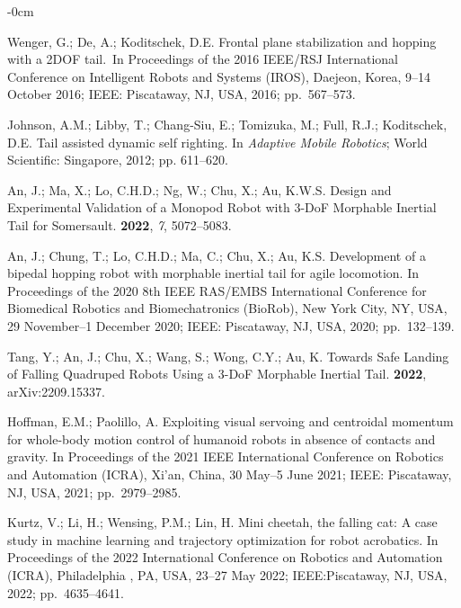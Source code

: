 \documentclass[sensors,article,accept,pdftex,moreauthors]{Definitions/mdpi}
\begin{document}
\begin{adjustwidth}{-\extralength}{0cm}
\begin{thebibliography}{999}
Wenger, G.; De, A.; Koditschek, D.E.
\newblock Frontal plane stabilization and hopping with a 2DOF tail.~In Proceedings of the 2016 IEEE/RSJ International Conference on
  Intelligent Robots and Systems (IROS), Daejeon, Korea, 9--14 October 2016; IEEE: \mbox{Piscataway}, NJ, USA,  2016; pp.~567--573.

Johnson, A.M.; Libby, T.; Chang-Siu, E.; Tomizuka, M.; Full, R.J.; Koditschek,
  D.E.
\newblock Tail assisted dynamic self righting. In {\em Adaptive Mobile
  Robotics}; World Scientific: Singapore,
  2012; pp. 611--620.

An, J.; Ma, X.; Lo, C.H.D.; Ng, W.; Chu, X.; Au, K.W.S.
\newblock Design and Experimental Validation of a Monopod Robot with 3-DoF
  Morphable Inertial Tail for Somersault.
 {\bf 2022}, \emph{7}, 5072--5083.

An, J.; Chung, T.; Lo, C.H.D.; Ma, C.; Chu, X.; Au, K.S.
\newblock Development of a bipedal hopping robot with morphable inertial tail
  for agile locomotion.
\newblock In Proceedings of the 2020 8th IEEE RAS/EMBS International Conference
  for Biomedical Robotics and Biomechatronics (BioRob),  New York City, NY, USA, 29 November--1 December 2020; IEEE: Piscataway, NJ, USA,  2020; \mbox{pp.
  132--139.}

Tang, Y.; An, J.; Chu, X.; Wang, S.; Wong, C.Y.; Au, K.
\newblock Towards Safe Landing of Falling Quadruped Robots Using a 3-DoF
  Morphable Inertial Tail.
 {\bf 2022},  arXiv:2209.15337.

Hoffman, E.M.; Paolillo, A.
\newblock Exploiting visual servoing and centroidal momentum for whole-body
  motion control of humanoid robots in absence of contacts and gravity.
\newblock In Proceedings of the 2021 IEEE International Conference on Robotics
  and Automation (ICRA), Xi'an, China, 30 May--5 June 2021; IEEE: Piscataway, NJ, USA,  2021; pp.~2979--2985.

Kurtz, V.; Li, H.; Wensing, P.M.; Lin, H.
\newblock Mini cheetah, the falling cat: A case study in machine learning and
  trajectory optimization for robot acrobatics.
\newblock In Proceedings of the 2022 International Conference on Robotics and
  Automation (ICRA), Philadelphia , PA, USA, 23--27 May 2022; IEEE:Piscataway, NJ, USA,  2022; pp.~4635--4641.


\end{thebibliography}
\end{adjustwidth}
\end{document}
